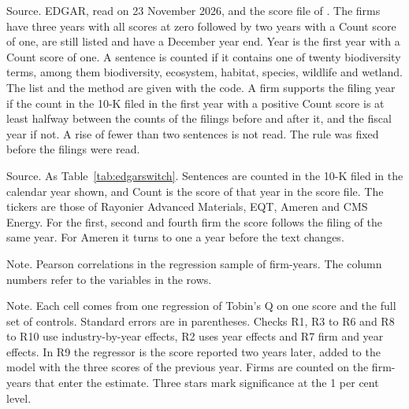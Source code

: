 \documentclass[12pt,a4paper]{article}
\newcommand{\tablenote}[1]{\par\smallskip\begin{minipage}{\linewidth}\footnotesize\setstretch{1.05}#1\end{minipage}}
\newcommand{\widetable}[1]{\resizebox{\ifdim\width>\linewidth\linewidth\else\width\fi}{!}{}}
\begin{document}
\begin{table}[!htbp]
\centering\footnotesize
\caption{Check of the score year against the text of filings on EDGAR}\label{tab:edgarswitch}
\widetable{tables/tab_edgar_switch}
\tablenote{Source. EDGAR, read on 23 November 2026, and the score file of \citet{giglio2026}. The firms have three years with all scores at zero followed by two years with a Count score of one, are still listed and have a December year end. Year is the first year with a Count score of one. A sentence is counted if it contains one of twenty biodiversity terms, among them biodiversity, ecosystem, habitat, species, wildlife and wetland. The list and the method are given with the code. A firm supports the filing year if the count in the 10-K filed in the first year with a positive Count score is at least halfway between the counts of the filings before and after it, and the fiscal year if not. A rise of fewer than two sentences is not read. The rule was fixed before the filings were read.}
\end{table}

\begin{table}[!htbp]
\centering\small
\caption{Sentences with a biodiversity term in each 10-K and the Count score of the same year}\label{tab:edgarhistory}
\widetable{tables/tab_edgar_history}
\tablenote{Source. As Table~\ref{tab:edgarswitch}. Sentences are counted in the 10-K filed in the calendar year shown, and Count is the score of that year in the score file. The tickers are those of Rayonier Advanced Materials, EQT, Ameren and CMS Energy. For the first, second and fourth firm the score follows the filing of the same year. For Ameren it turns to one a year before the text changes.}
\end{table}

\begin{table}[!htbp]
\centering\footnotesize
\caption{Correlations}\label{tab:correlations}
\widetable{tables/tab_correlations}
\tablenote{Note. Pearson correlations in the regression sample of \nFinal{} firm-years. The column numbers refer to the variables in the rows.}
\end{table}

\begin{table}[!htbp]
\centering\small
\caption{Robustness checks}\label{tab:robustness}
\widetable{tables/tab_robustness}
\tablenote{Note. Each cell comes from one regression of Tobin's Q on one score and the full set of controls. Standard errors are in parentheses. Checks R1, R3 to R6 and R8 to R10 use industry-by-year effects, R2 uses year effects and R7 firm and year effects. In R9 the regressor is the score reported two years later, added to the model with the three scores of the previous year. Firms are counted on the firm-years that enter the estimate. Three stars mark significance at the 1 per cent level.}
\end{table}
\end{document}
